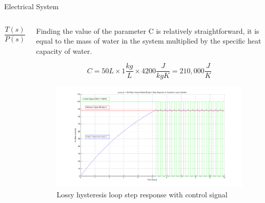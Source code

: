 \documentclass[final]{beamer}
\newlength{\onecolwid}
\newlength{\twocolwid}
\begin{document}
\begin{frame}[t]
\begin{columns}[t]
\begin{column}{\twocolwid}
\begin{block}{Electrical System}
\begin{columns}[t,totalwidth=\twocolwid]
\begin{column}{\onecolwid}
\begin{justify}
\begin{equation}
\frac{T(s)}{P(s)} = \frac{1}{Cs + k}
\label{eq:result-heat}
\end{equation}
\end{justify}

\end{column} %

\begin{column}{\onecolwid} %
\vspace{-0.3in}
\begin{justify}
Finding the value of the parameter C is relatively straightforward, it is equal to the mass of water in the system multiplied by the specific heat capacity of water.

\begin{equation}
C = 50L \times 1\frac{kg}{L} \times 4200\frac{J}{kgK} = 210,000\frac{J}{K}
\label{eq:value-heat}
\end{equation}

\begin{figure}
\includegraphics[width=\linewidth]{hysteresis-step-lossy.png}
\caption{Lossy hysteresis loop step response with control signal}
\end{figure}
\end{justify}

\end{column} %

\end{columns} %


\end{block}
\end{column}
\end{columns}
\end{frame}
\end{document}
